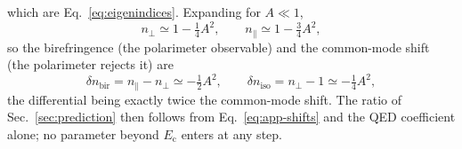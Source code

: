 \documentclass[aps,prd,twocolumn,superscriptaddress,nofootinbib,longbibliography]{revtex4-2}
\newcommand{\Ec}{E_{\mathrm{c}}}
\newcommand{\dnbir}{\delta n_{\mathrm{bir}}}
\begin{document}
%
which are Eq.~\eqref{eq:eigenindices}. Expanding for $A\ll1$,
%
\begin{equation}
  n_\perp\simeq1-\tfrac14 A^2,\qquad n_\parallel\simeq1-\tfrac34 A^2,
  \label{eq:app-expand}
\end{equation}
%
so the birefringence (the polarimeter observable) and the common-mode shift (the
polarimeter rejects it) are
%
\begin{equation}
  \dnbir=n_\parallel-n_\perp\simeq-\tfrac12 A^2,\qquad
  \delta n_{\mathrm{iso}}=n_\perp-1\simeq-\tfrac14 A^2,
  \label{eq:app-shifts}
\end{equation}
%
the differential being exactly twice the common-mode shift. The ratio of
Sec.~\ref{sec:prediction} then follows from Eq.~\eqref{eq:app-shifts} and the QED
coefficient alone; no parameter beyond $\Ec$ enters at any step.



\end{document}
